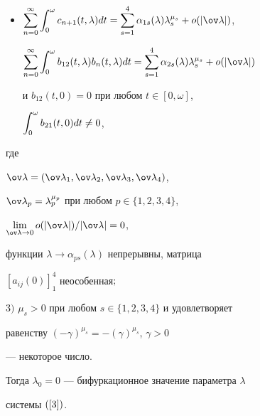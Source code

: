 \begin{thm}
\begin{itemize}
и  $b_{21} (t,0)=0$ при любом $t \in [0,\omega]$,


$\ds\int_0^\omega b_{12} (t,0)dt \ne 0;$


\item[IV.]


$\ds\sum_{n=0}^\infty \ds\int_0^\omega c_{n+1} (t,\lambda)dt=


\ds\sum_{s=1}^4 \alpha_{1s} (\lambda)\lambda_s^{\mu_s}+o(|\ov \lambda|)$,


$\ds\sum_{n=0}^\infty \ds\int_0^\omega b_{12} (t,\lambda)b_n (t,\lambda)dt =


\ds\sum_{s=1}^4 \alpha_{2s} (\lambda)\lambda_s^{\mu_s}+o(|\ov \lambda |)$


и  $b_{12} (t,0)=0$ при любом $t \in [0,\omega]$,


$\displaystyle\int_0^\omega b_{21} (t,0)dt \ne 0$,


\end{itemize}


где


$\ov \lambda =(\ov \lambda_1,\ov \lambda_2,\ov \lambda_3,\ov \lambda_4)$,


$\ov \lambda_p =\lambda_p^{\mu_p}$ при любом $p \in \{1,2,3,4\}$,


$\lim\limits_{\ov \lambda \to 0} o(|\ov \lambda |)/|\ov \lambda |=0$,


функции $\lambda \to \alpha_{ps} (\lambda)$ непрерывны, матрица


$[a_{ij} (0)]_1^4$ неособенная$;$





$3)$  $\mu_s >0$ при любом $s \in \{1,2,3,4\}$ и удовлетворяет


равенству $(- \gamma)^{\mu_s} = - (\gamma)^{\mu_s}$, $\gamma >0$


--- некоторое число.





Тогда $\lambda_0=0$ --- бифуркационное значение параметра $\lambda$


системы $(\ref{3})$.


\end{thm}





